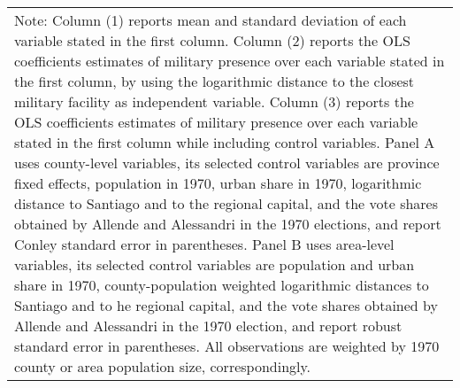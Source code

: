 \begin{tabular}{l*{7}{c}}
\multicolumn{8}{p{20cm}}{\footnotesize Note: Column (1) reports mean and standard deviation of each variable stated in the first column. Column (2) reports the OLS coefficients estimates of military presence over each variable stated in the first column, by using the logarithmic distance to the closest military facility as independent variable. Column (3) reports the OLS coefficients estimates of military presence over each variable stated in the first column while including control variables. Panel A uses county-level variables, its selected control variables are province fixed effects, population in 1970, urban share in 1970, logarithmic distance to Santiago and to the regional capital, and the vote shares obtained by Allende and Alessandri in the 1970 elections, and report Conley standard error in parentheses. Panel B uses area-level variables, its selected control variables are population and urban share in 1970, county-population weighted logarithmic distances to Santiago and to he regional capital, and the vote shares obtained by Allende and Alessandri in the 1970 election, and report robust standard error in parentheses. All observations are weighted by 1970 county or area population size, correspondingly.}\\
\end{tabular}